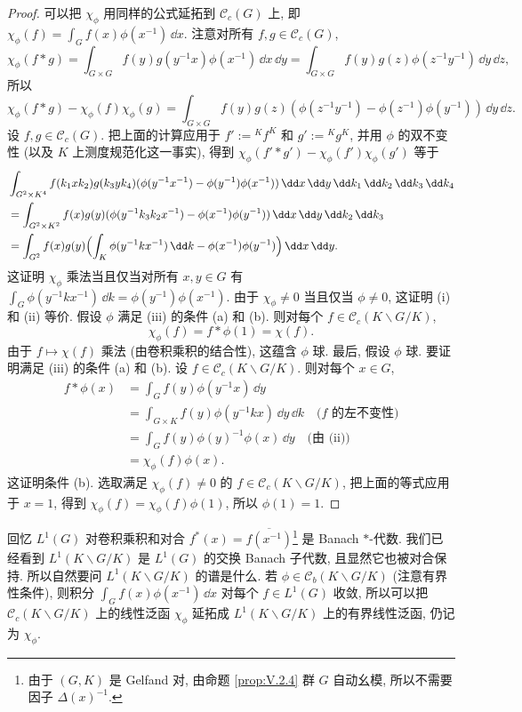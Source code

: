 \begin{proof}
可以把 $\chi_{\phi}$ 用同样的公式延拓到 $\mathcal{C}_c(G)$ 上, 即 $\chi_{\phi}(f) = \int_G f(x)\phi(x^{-1})\,\dd x$. 注意对所有 $f, g \in \mathcal{C}_c(G)$,
\[
\chi_{\phi}(f * g) = \int_{G \times G}f(y)g(y^{-1}x)\phi(x^{-1})\,\dd x\,\dd y = \int_{G \times G}f(y)g(z)\phi(z^{-1}y^{-1})\,\dd y\,\dd z,
\]
所以
\[
\chi_{\phi}(f * g) - \chi_{\phi}(f)\chi_{\phi}(g) = \int_{G \times G}f(y)g(z)(\phi(z^{-1}y^{-1}) - \phi(z^{-1})\phi(y^{-1}))\,\dd y\,\dd z.
\]
设 $f, g \in \mathcal{C}_c(G)$. 把上面的计算应用于 $f' := {}^Kf^K$ 和 $g' := {}^Kg^K$, 并用 $\phi$ 的双不变性 (以及 $K$ 上测度规范化这一事实), 得到 $\chi_{\phi}(f' * g') - \chi_{\phi}(f')\chi_{\phi}(g')$ 等于
\begin{align*}
&\int_{G^2 \times K^4}f(k_1xk_2)g(k_3yk_4)(\phi(y^{-1}x^{-1}) - \phi(y^{-1})\phi(x^{-1}))\,\dd x\,\dd y\,\dd k_1\,\dd k_2\,\dd k_3\,\dd k_4 \\
&= \int_{G^2 \times K^2}f(x)g(y)(\phi(y^{-1}k_3k_2x^{-1}) - \phi(x^{-1})\phi(y^{-1}))\,\dd x\,\dd y\,\dd k_2\,\dd k_3 \\
&= \int_{G^2}f(x)g(y)\Bigl(\int_K\phi(y^{-1}kx^{-1})\,\dd k - \phi(x^{-1})\phi(y^{-1})\Bigr)\,\dd x\,\dd y.
\end{align*}
这证明 $\chi_{\phi}$ 乘法当且仅当对所有 $x, y \in G$ 有 $\int_G\phi(y^{-1}kx^{-1})\,\dd k = \phi(y^{-1})\phi(x^{-1})$. 由于 $\chi_{\phi} \neq 0$ 当且仅当 $\phi \neq 0$, 这证明 (i) 和 (ii) 等价.
假设 $\phi$ 满足 (iii) 的条件 (a) 和 (b). 则对每个 $f \in \mathcal{C}_c(K\backslash G/K)$,
\[
\chi_{\phi}(f) = f * \phi(1) = \chi(f).
\]
由于 $f \longmapsto \chi(f)$ 乘法 (由卷积乘积的结合性), 这蕴含 $\phi$ 球.
最后, 假设 $\phi$ 球. 要证明满足 (iii) 的条件 (a) 和 (b). 设 $f \in \mathcal{C}_c(K\backslash G/K)$. 则对每个 $x \in G$,
\begin{align*}
f * \phi(x) &= \int_G f(y)\phi(y^{-1}x)\,\dd y \\
&= \int_{G \times K}f(y)\phi(y^{-1}kx)\,\dd y\,\dd k \quad \text{($f$ 的左不变性)} \\
&= \int_G f(y)\phi(y)^{-1}\phi(x)\,\dd y \quad \text{(由 (ii))} \\
&= \chi_{\phi}(f)\phi(x).
\end{align*}
这证明条件 (b). 选取满足 $\chi_{\phi}(f) \neq 0$ 的 $f \in \mathcal{C}_c(K\backslash G/K)$, 把上面的等式应用于 $x = 1$, 得到 $\chi_{\phi}(f) = \chi_{\phi}(f)\phi(1)$, 所以 $\phi(1) = 1$.
\end{proof}

回忆 $L^1(G)$ 对卷积乘积和对合 $f^*(x) = \overline{f(x^{-1})}$\footnote{由于 $(G, K)$ 是 Gelfand 对, 由命题 \ref{prop:V.2.4} 群 $G$ 自动幺模, 所以不需要因子 $\Delta(x)^{-1}$.} 是 Banach $*$-代数. 我们已经看到 $L^1(K\backslash G/K)$ 是 $L^1(G)$ 的交换 Banach 子代数, 且显然它也被对合保持. 所以自然要问 $L^1(K\backslash G/K)$ 的谱是什么.
若 $\phi \in \mathcal{C}_b(K\backslash G/K)$ (注意有界性条件), 则积分 $\int_G f(x)\phi(x^{-1})\,\dd x$ 对每个 $f \in L^1(G)$ 收敛, 所以可以把 $\mathcal{C}_c(K\backslash G/K)$ 上的线性泛函 $\chi_{\phi}$ 延拓成 $L^1(K\backslash G/K)$ 上的有界线性泛函, 仍记为 $\chi_{\phi}$.

